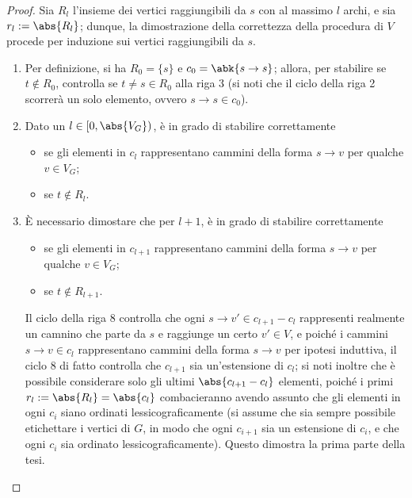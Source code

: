 \documentclass[a4paper, 12pt]{report}
\begin{document}
\begin{proof}
        Sia $R_l$ l'insieme dei vertici raggiungibili da $s$ con al massimo $l$ archi, e sia $r_l := \abs{R_l}$; dunque, la dimostrazione della correttezza della procedura  di $V$ procede per induzione sui vertici raggiungibili da $s$.

            \begin{enumerate}[label=]
                \item {} Per definizione, si ha $R_0 = \{ s\}$ e $c_0 = \abk{s \to s}$; allora, per stabilire se $t \notin R_0$,  controlla se $t \neq s \in R_0$ alla riga 3 (si noti che il ciclo della riga 2 scorrerà un solo elemento, ovvero $s \to s \in c_0$).
                \item {} Dato un $l \in [0, \abs{V_G})$,  è in grado di stabilire correttamente

                    \begin{itemize}
                        \item se gli elementi in $c_l$ rappresentano cammini della forma $s \to v$ per qualche $v \in V_G$;
                        \item se $t \notin R_l$.
                    \end{itemize} 

                \item {} È necessario dimostare che per $l+1$,  è in grado di stabilire correttamente

                    \begin{itemize}
                        \item se gli elementi in $c_{l + 1}$ rappresentano cammini della forma $s \to v$ per qualche $v \in V_G$;
                        \item se $t \notin R_{l + 1}$.
                    \end{itemize}

                    Il ciclo della riga 8 controlla che ogni $s \to v' \in c_{l + 1} - c_l$ rappresenti realmente un camnino che parte da $s$ e raggiunge un certo $v' \in V$, e poiché i cammini $s \to v \in c_l$ rappresentano cammini della forma $s \to v$ per ipotesi induttiva, il ciclo 8 di fatto controlla che $c_{l + 1}$ sia un'estensione di $c_l$; si noti inoltre che è possibile considerare solo gli ultimi $\abs{c_{l +1} - c_l}$ elementi, poiché i primi $r_l := \abs{R_l} = \abs{c_l}$ combacieranno avendo assunto che gli elementi in ogni $c_i$ siano ordinati lessicograficamente (si assume che sia sempre possibile etichettare i vertici di $G$, in modo che ogni $c_{i +1 }$ sia un estensione di $c_i$, e che ogni $c_i$ sia ordinato lessicograficamente). Questo dimostra la prima parte della tesi.


\end{enumerate}
\end{proof}
\end{document}

